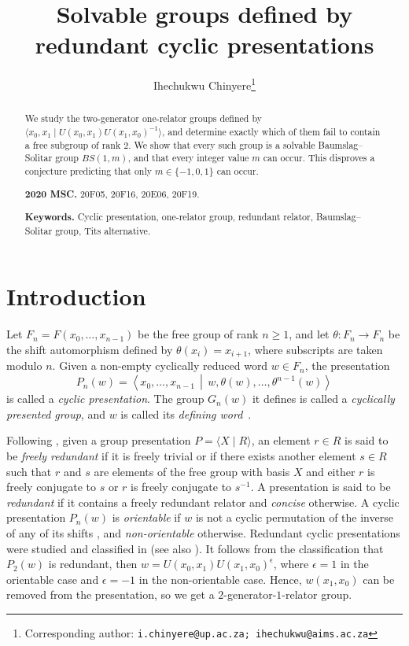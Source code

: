 \documentclass[a4paper,12pt,oneside]{article}
\title{Solvable groups defined by redundant cyclic presentations}
\author{Ihechukwu Chinyere\thanks{Corresponding author: \texttt{i.chinyere@up.ac.za; ihechukwu@aims.ac.za}}}
\affil{Department of Mathematics and Applied Mathematics, University of Pretoria, Hatfield 0028, Pretoria, South Africa}
\theoremstyle{definition}
\begin{document}
\maketitle

\begin{abstract}
\noindent
We study the two-generator one-relator groups defined by $\langle x_0,x_1\mid U(x_0,x_1)U(x_1,x_0)^{-1}\rangle$, and determine exactly which of them fail to contain a free subgroup of rank $2$. We show that every such group is a solvable Baumslag--Solitar group $BS(1,m)$, and that every integer value $m$ can occur. This disproves a conjecture predicting that only $m\in \{-1,0,1\}$ can occur.


\vspace{1em}
\noindent\textbf{2020 MSC. }20F05, 20F16, 20E06, 20F19.

\noindent\textbf{Keywords.} Cyclic presentation, one-relator group, redundant relator, Baumslag--Solitar group, Tits alternative.
\end{abstract}


\section{Introduction}
\label{sec:intro}

Let \(F_n=F(x_0,\ldots,x_{n-1})\) be the free group of rank \(n\geq 1\), and let \(\theta:F_n\to F_n\) be the shift automorphism defined by \(\theta(x_i)=x_{i+1}\), where subscripts are taken modulo \(n\). Given a non-empty cyclically reduced word \(w\in F_n\), the presentation
$$
P_n(w)=\left\langle x_0,\ldots,x_{n-1}\,\middle|\,w,\theta(w),\ldots,\theta^{n-1}(w)\right\rangle
$$
is called a \emph{cyclic presentation}. The group \(G_n(w)\) it defines is called a \emph{cyclically presented group}, and \(w\) is called its \emph{defining word}~\cite{Johnson1997}.

\medskip
Following \cite[page 160]{Bogley2014}, given a group presentation \(P=\langle X\mid R\rangle\), an element \(r\in R\) is said to be \emph{freely redundant} if it is freely trivial or if there exists another element \(s\in R\) such that \(r\) and \(s\) are elements of the free group with basis \(X\) and either \(r\) is freely conjugate to \(s\) or \(r\) is freely conjugate to \(s^{-1}\). A presentation is said to be \emph{redundant} if it contains a freely redundant relator and \emph{concise} otherwise. A cyclic presentation \(P_n(w)\) is \emph{orientable} if \(w\) is not a cyclic permutation of the inverse of any of its shifts \cite[page 155]{Bogley2014}, and \emph{non-orientable} otherwise. Redundant cyclic presentations were studied and classified in \cite{ChinyereWilliams2023} (see also \cite{ChinyereWilliams2022}). It follows from the classification that $P_2(w)$ is redundant, then $w=U(x_0,x_1)U(x_1,x_0)^\epsilon$, where $\epsilon=1$ in the orientable case and $\epsilon=-1$ in the non-orientable case. Hence, $w(x_1,x_0)$ can be removed from the presentation, so we get a $2$-generator-$1$-relator group.
\end{document}

